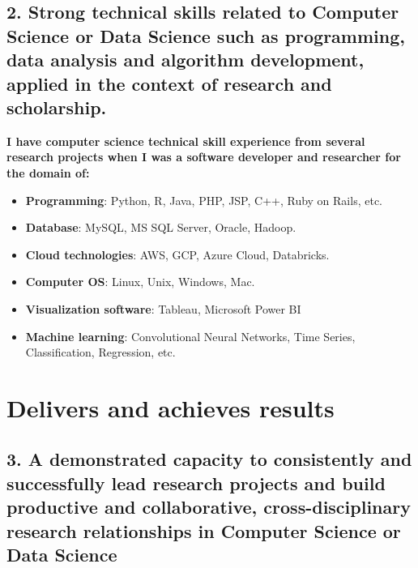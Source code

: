 \documentclass[12pt]{article}
\begin{document}
\subsection*{2. Strong technical skills related to Computer Science or Data Science such as programming, data analysis and algorithm development, applied in the context of research and scholarship.}
{\bfseries I have computer science technical skill experience from several research projects when I was a software developer and researcher for the domain of:}
\begin{itemize}
    \item \textbf{Programming}: Python, R, Java, PHP, JSP, C++, Ruby on Rails, etc.
    \item \textbf{Database}: MySQL, MS SQL Server, Oracle, Hadoop.
    \item \textbf{Cloud technologies}: AWS, GCP, Azure Cloud, Databricks.
    \item \textbf{Computer OS}: Linux, Unix, Windows, Mac.
    \item \textbf{Visualization software}: Tableau, Microsoft Power BI
    \item \textbf{Machine learning}: Convolutional Neural Networks, Time Series, Classification, Regression, etc.
\end{itemize}


\section*{Delivers and achieves results}
\subsection*{3. A demonstrated capacity to consistently and successfully lead research projects and build productive and collaborative, cross-disciplinary research relationships in Computer Science or Data Science}
\end{document}

